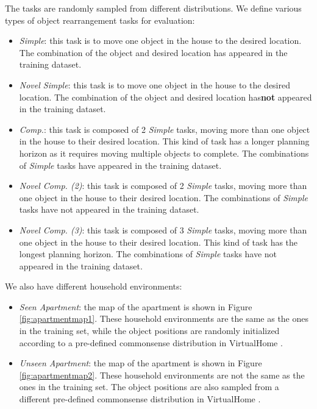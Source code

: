 The tasks are randomly sampled from different distributions. We define various types of object rearrangement tasks for evaluation: 
\begin{itemize}
    \item \textit{Simple}: this task is to move one object in the house to the desired location. The combination of the object and desired location has appeared in the training dataset. 
    \item \textit{Novel Simple}: this task is to move one object in the house to the desired location. The combination of the object and desired location has\textbf{not} appeared in the training dataset. 
    \item \textit{Comp.}: this task is composed of 2 \textit{Simple} tasks, moving more than one object in the house to their desired location. This kind of task has a longer planning horizon as it requires moving multiple objects to complete. The combinations of \textit{Simple} tasks have appeared in the training dataset. 
    \item \textit{Novel Comp. (2)}: this task is composed of 2 \textit{Simple} tasks, moving more than one object in the house to their desired location. The combinations of \textit{Simple} tasks have not appeared in the training dataset. 
    \item \textit{Novel Comp. (3)}: this task is composed of 3 \textit{Simple} tasks, moving more than one object in the house to their desired location. This kind of task has the longest planning horizon. The combinations of \textit{Simple} tasks have not appeared in the training dataset. 
\end{itemize}
We also have different household environments:
\begin{itemize}
    \item \textit{Seen Apartment}: the map of the apartment is shown in Figure \ref{fig:apartmentmap1}. These household environments are the same as the ones in the training set, while the object positions are randomly initialized according to a pre-defined commonsense distribution in VirtualHome \cite{puig2018virtualhome}.
    \item \textit{Unseen Apartment}: the map of the apartment is shown in Figure \ref{fig:apartmentmap2}. These household environments are not the same as the ones in the training set. The object positions are also sampled from a different pre-defined commonsense distribution in VirtualHome \cite{puig2018virtualhome}. 
\end{itemize}


